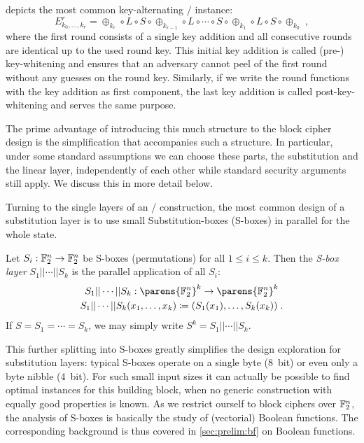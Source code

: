  depicts the most common key-alternating \SPN/ instance:
\begin{equation*}
    E_{k_0,\ldots,k_r}^r = \oplus_{k_r} \circ L \circ S \circ \oplus_{k_{r-1}} \circ L \circ \cdots \circ S \circ \oplus_{k_1} \circ L \circ S \circ \oplus_{k_0}\;,
\end{equation*}
where the first round consists of a single key addition and all consecutive rounds are identical up to the used round key.
This initial key addition is called (pre-) key-whitening and ensures that an adversary cannot peel of the first round without any guesses on the round key.
Similarly, if we write the round functions with the key addition as first component, the last key addition is called post-key-whitening and serves the same purpose.

The prime advantage of introducing this much structure to the block cipher design is the simplification that accompanies such a structure.
In particular, under some standard assumptions we can choose these parts, the substitution and the linear layer, independently of each other while standard security arguments still apply.
We discuss this in more detail below.

Turning to the single layers of an \SPN/ construction, the most common design of a substitution layer is to use small Substitution-boxes (S-boxes) in parallel for the whole state.
\begin{definition}
    Let $S_i : \mathbb{F}_2^n \to \mathbb{F}_2^n$ be S-boxes (permutations) for all $1 \leqslant i \leqslant k$.
    Then the \emph{S-box layer} $S_1 || \cdots || S_k$ is the parallel application of all $S_i$:
    \begin{gather*}
        S_1 || \cdots || S_k : \parens{\F_2^n}^k \to \parens{\F_2^n}^k \\
        S_1 || \cdots || S_k(x_1, \ldots, x_k) \coloneqq (S_1(x_1), \ldots, S_k(x_k))\;.
    \end{gather*}
    If $S = S_1 = \cdots = S_k$, we may simply write $S^k = S_1 || \cdots || S_k$.
\end{definition}
This further splitting into S-boxes greatly simplifies the design exploration for substitution layers: typical S-boxes operate on a single byte (8~bit) or even only a byte nibble (4~bit).
For such small input sizes it can actually be possible to find optimal instances for this building block, when no generic construction with equally good properties is known.
As we restrict ourself to block ciphers over $\mathbb{F}_2^n$, the analysis of S-boxes is basically the study of (vectorial) Boolean functions.
The corresponding background is thus covered in \cref{sec:prelim:bf} on Boolean functions.


